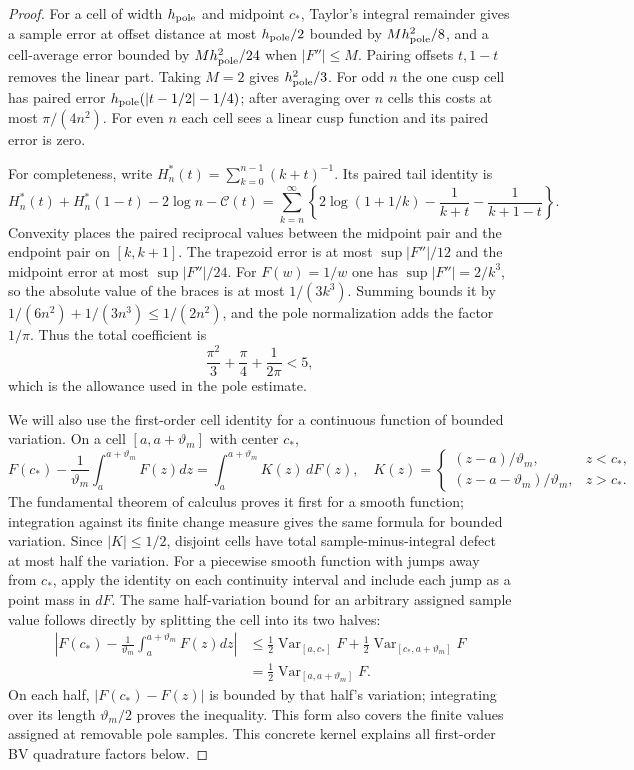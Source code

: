 \begin{proof}
For a cell of width $h_{\rm pole}$ and midpoint $c_*$, Taylor's integral
remainder gives a sample error at offset distance at most $h_{\rm pole}/2$
bounded by $M h_{\rm pole}^2/8$, and a cell-average error bounded by $M h_{\rm pole}^2/24$
when $|F''|\leq M$. Pairing offsets $t,1-t$ removes the linear
part. Taking $M=2$ gives $h_{\rm pole}^2/3$. For odd $n$ the one cusp cell
has paired error $h_{\rm pole}(|t-1/2|-1/4)$; after averaging over $n$ cells
this costs at most $\pi/(4n^2)$. For even $n$ each cell sees a linear
cusp function and its paired error is zero.

For completeness, write $H_n^*(t)=\sum_{k=0}^{n-1}(k+t)^{-1}$.
Its paired tail identity is
\[
 H_n^*(t)+H_n^*(1-t)-2\log n-\mathcal C(t)
 =\sum_{k=n}^\infty\left\{2\log(1+1/k)-\frac1{k+t}-\frac1{k+1-t}\right\}.
\]
Convexity places the paired reciprocal values between the midpoint
pair and the endpoint pair on $[k,k+1]$. The trapezoid error is at
most $\sup|F''|/12$ and the midpoint error at most
$\sup|F''|/24$. For $F(w)=1/w$ one has
$\sup|F''|=2/k^3$, so the absolute value of the braces is at most
$1/(3k^3)$. Summing bounds it by
$1/(6n^2)+1/(3n^3)\leq1/(2n^2)$, and the pole normalization
adds the factor $1/\pi$. Thus the total coefficient is
\[
 \frac{\pi^2}{3}+\frac\pi4+\frac1{2\pi}<5,
\]
which is the allowance used in the pole estimate.

We will also use the first-order cell identity for a continuous
function of bounded variation. On a cell $[a,a+\vartheta_m]$ with center $c_*$,
\[
 F(c_*)-\frac1{\vartheta_m}\int_a^{a+\vartheta_m}F(z)dz
 =\int_a^{a+\vartheta_m}K(z)\,dF(z),\quad
 K(z)=\begin{cases}(z-a)/\vartheta_m,&z<c_*,\\(z-a-\vartheta_m)/\vartheta_m,&z>c_*.
 \end{cases}
\]
The fundamental theorem of calculus proves it first for a smooth
function; integration against its finite change measure gives the same
formula for bounded variation. Since $|K|\leq1/2$, disjoint cells
have total sample-minus-integral defect at most half the variation.
For a piecewise smooth function with jumps away from $c_*$, apply the
identity on each continuity interval and include each jump as a point
mass in $dF$. The same half-variation bound for an arbitrary assigned
sample value follows directly by splitting the cell into its two halves:
\[
 \begin{aligned}
 \left|F(c_*)-\frac1{\vartheta_m}\int_a^{a+\vartheta_m}F(z)dz\right|
 &\leq\tfrac12\operatorname{Var}_{[a,c_*]}F
            +\tfrac12\operatorname{Var}_{[c_*,a+\vartheta_m]}F\\
 &=\tfrac12\operatorname{Var}_{[a,a+\vartheta_m]}F.
 \end{aligned}
\]
On each half, $|F(c_*)-F(z)|$ is bounded by that half's variation;
integrating over its length $\vartheta_m/2$ proves the inequality. This form
also covers the finite values assigned at removable pole samples.
This concrete kernel explains all first-order BV quadrature factors
below.


\end{proof}
